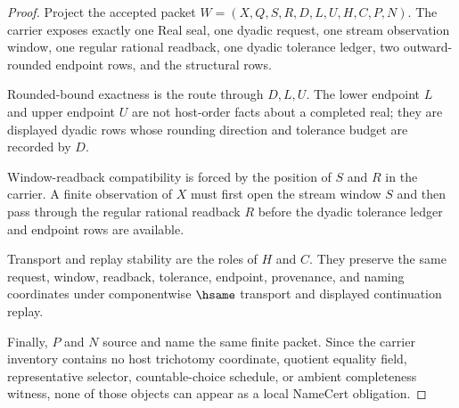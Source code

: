 \begin{proof}
Project the accepted packet $W=(X,Q,S,R,D,L,U,H,C,P,N)$. The carrier exposes exactly one Real seal, one dyadic request, one stream observation window, one regular rational readback, one dyadic tolerance ledger, two outward-rounded endpoint rows, and the structural rows.

Rounded-bound exactness is the route through $D,L,U$. The lower endpoint $L$ and upper endpoint $U$ are not host-order facts about a completed real; they are displayed dyadic rows whose rounding direction and tolerance budget are recorded by $D$.

Window-readback compatibility is forced by the position of $S$ and $R$ in the carrier. A finite observation of $X$ must first open the stream window $S$ and then pass through the regular rational readback $R$ before the dyadic tolerance ledger and endpoint rows are available.

Transport and replay stability are the roles of $H$ and $C$. They preserve the same request, window, readback, tolerance, endpoint, provenance, and naming coordinates under componentwise $\hsame$ transport and displayed continuation replay.

Finally, $P$ and $N$ source and name the same finite packet. Since the carrier inventory contains no host trichotomy coordinate, quotient equality field, representative selector, countable-choice schedule, or ambient completeness witness, none of those objects can appear as a local NameCert obligation.
\end{proof}

